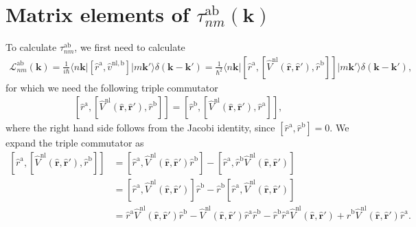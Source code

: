 
\section{Matrix elements of 
\texorpdfstring{$\tau^{\mathrm{a}\mathrm{b}}_{nm}(\mathbf{k})$}{tnm}}
\label{app:calt}

To calculate $\tau^{\mathrm{a}\mathrm{b}}_{nm}$, we first need to calculate
\begin{align}\label{3.1}
\mathcal{L}^{\mathrm{a}\mathrm{b}}_{nm}(\mathbf{k})
=\frac{1}{i\hbar}\langle n\mathbf{k}\vert 
\left[\hat{r}^{\mathrm{a}},\hat{v}^{\mathrm{nl},\mathrm{b}}\right]
\vert m\mathbf{k}'\rangle \delta(\mathbf{k}-\mathbf{k}')
= \frac{1}{\hbar^{2}}
\langle n\mathbf{k}\vert 
\left[\hat{r}^{\mathrm{a}},
\left[\hat{V}^\mathrm{nl}(\hat{\mathbf{r}},\hat{\mathbf{r}}'),\hat{r}^\mathrm{b}
\right]
\right]
\vert m\mathbf{k}'\rangle\delta(\mathbf{k}-\mathbf{k}'),
\end{align} 
for which we need the following triple commutator
\begin{align}\label{3.2}
\left[\hat{r}^{\mathrm{a}},
\left[\hat{V}^\mathrm{nl}(\hat{\mathbf{r}},\hat{\mathbf{r}}'),\hat{r}^\mathrm{b}
\right]
\right]
= \left[\hat{r}^{\mathrm{b}},
\left[\hat{V}^\mathrm{nl}(\hat{\mathbf{r}},\hat{\mathbf{r}}'),\hat{r}^\mathrm{a}
\right]
\right],
\end{align} 
where the right hand side follows from the Jacobi identity, since
$[\hat{r}^\mathrm{a},\hat{r}^\mathrm{b}] = 0$. We expand the triple commutator
as
\begin{align}\label{3.3}
\left[
  \hat{r}^{\mathrm{a}},
\left[
  \hat{V}^\mathrm{nl}(\hat{\mathbf{r}},\hat{\mathbf{r}}'),
  \hat{r}^\mathrm{b}
\right]
\right]
&=\left[
  \hat{r}^{\mathrm{a}},
  \hat{V}^\mathrm{nl}(\hat{\mathbf{r}},\hat{\mathbf{r}}')
  \hat{r}^\mathrm{b}
\right]
-\left[
  \hat{r}^{\mathrm{a}},
  \hat{r}^\mathrm{b}\hat{V}^\mathrm{nl}(\hat{\mathbf{r}},\hat{\mathbf{r}}')
\right]\nonumber\\
&=\left[
  \hat{r}^{\mathrm{a}},
\hat{V}^\mathrm{nl}(\hat{\mathbf{r}},\hat{\mathbf{r}}')
\right]\hat{r}^\mathrm{b}
- \hat{r}^\mathrm{b}
\left[
  \hat{r}^{\mathrm{a}},
  \hat{V}^\mathrm{nl}(\hat{\mathbf{r}},\hat{\mathbf{r}}')
\right]\nonumber\\
&=\hat{r}^{\mathrm{a}}
  \hat{V}^\mathrm{nl}(\hat{\mathbf{r}},\hat{\mathbf{r}}')
  \hat{r}^\mathrm{b}
- \hat{V}^\mathrm{nl}(\hat{\mathbf{r}},\hat{\mathbf{r}}')
  \hat{r}^\mathrm{a}
  \hat{r}^{\mathrm{b}}
- \hat{r}^\mathrm{b}
  \hat{r}^{\mathrm{a}}
  \hat{V}^\mathrm{nl}(\hat{\mathbf{r}},\hat{\mathbf{r}}')
+ \hat{r}^\mathrm{b}
  \hat{V}^\mathrm{nl}(\hat{\mathbf{r}},\hat{\mathbf{r}}')
  \hat{r}^{\mathrm{a}}.
\end{align}
